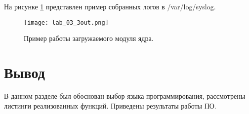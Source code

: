     На рисунке \ref{3out} представлен пример собранных логов в /var/log/syslog.
    \begin{figure}[h!]
        \centering
        \texttt{[image: lab\_03\_3out.png]}
        \caption{Пример работы загружаемого модуля ядра.}
        \label{3out}
    \end{figure}

\section{Вывод}
    В данном разделе был обоснован выбор языка программирования, 
    рассмотрены листинги реализованных функций. 
    Приведены результаты работы ПО.

\pagebreak
